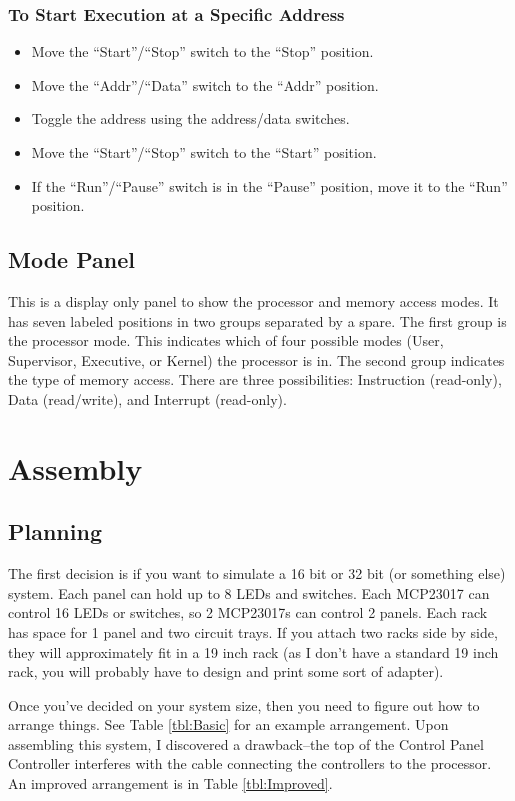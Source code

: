 \documentclass[10pt, openany]{book}
\newcommand{\switch}[2]{``#1''/``#2''}
\newcommand{\position}[1]{``#1''}
\begin{document}
\subsubsection{To Start Execution at a Specific Address}
\begin{itemize}
  \item Move the \switch{Start}{Stop} switch to the \position{Stop} position.
  \item Move the \switch{Addr}{Data} switch to the \position{Addr} position.
  \item Toggle the address using the address/data switches.
  \item Move the \switch{Start}{Stop} switch to the \position{Start} position.
  \item If the \switch{Run}{Pause} switch is in the \position{Pause} position, move it to the \position{Run} position.
\end{itemize}

\subsection{Mode Panel}
This is a display only panel to show the processor and memory access modes.  It has seven labeled positions in two groups separated by a spare.  The first group is the processor mode.  This indicates which of four possible modes (User, Supervisor, Executive, or Kernel) the processor is in.  The second group indicates the type of memory access.  There are three possibilities: Instruction (read-only), Data (read/write), and Interrupt (read-only).

\section{Assembly}

\subsection{Planning}
The first decision is if you want to simulate a 16 bit or 32 bit (or something else) system.  Each panel can hold up to 8 LEDs and switches.  Each MCP23017 can control 16 LEDs or switches, so 2 MCP23017s can control 2 panels.  Each rack has space for 1 panel and two circuit trays.  If you attach two racks side by side, they will approximately fit in a 19 inch rack (as I don't have a standard 19 inch rack, you will probably have to design and print some sort of adapter).

Once you've decided on your system size, then you need to figure out how to arrange things.  See Table \ref{tbl:Basic} for an example arrangement.  Upon assembling this system, I discovered a drawback--the top of the Control Panel Controller interferes with the cable connecting the controllers to the processor.  An improved arrangement is in Table \ref{tbl:Improved}.
\end{document}
